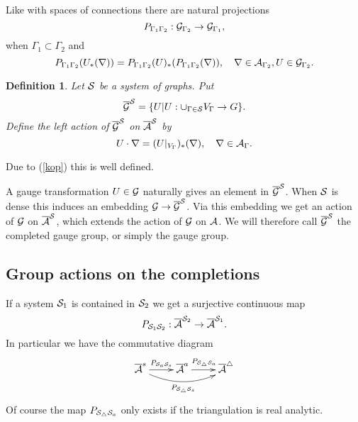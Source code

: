 \documentclass[12pt]{article}
\def\ca{{\cal A}}
\def\cg{{\cal G}}
\def\cs{{\cal S}}
\newtheorem{definition}[thm]{Definition}
\begin{document}
{Like with spaces of connections there are natural projections $$P_{\Gamma_1 \Gamma_2}:\cg_{\Gamma_2} \to \cg_{\Gamma_1},$$ 
when $\Gamma_1 \subset \Gamma_2$ and 
\begin{equation} \label{kop}
P_{\Gamma_1 \Gamma_2}(U_*(\nabla ))=P_{\Gamma_1 \Gamma_2}(U)_*(P_{\Gamma_1\Gamma_2}(\nabla)),\quad \nabla\in \ca_{\Gamma_2},U\in \cg_{\Gamma_2}.
 \end{equation}

\begin{definition}
Let $\cs$ be a system of graphs. Put 
$$\overline{\cg}^\cs=\{ U |U:\cup_{\Gamma \in \cs} V_\Gamma \to G\}.$$
Define the left action of $\overline{\cg}^\cs$ on $\overline{\ca}^\cs$ by
$$U \cdot \nabla= (U|_{V_\Gamma})_*(\nabla ),\quad \nabla\in \ca_\Gamma .$$  
\end{definition}

Due to (\ref{kop}) this is well defined.

A gauge transformation $U\in \cg$ naturally gives an element in $\overline{\cg}^\cs$. When $\cs$ is dense this induces an embedding $\cg \to \overline{\cg}^\cs$. Via this embedding we get an action of $\cg$ on $\overline{\ca}^\cs$, which extends the action of $\cg$ on $\ca$. We will therefore call $\overline{\cg}^\cs$ the completed gauge group, or simply the gauge group. 








\subsection{Group actions on the completions}
If a system $\cs_1$ is contained in $\cs_2$ we get a surjective continuous map 
$$P_{\cs_1 \cs_2}:\overline{\ca}^{\cs_2} \to \overline{\ca}^{\cs_1}.$$
In particular we have the commutative diagram
$$\hbox{\xymatrix{\overline{\ca}^s \ar@/_1pc/[rr]_{P_{\cs_\triangle \cs_s}}  \ar[r]^{P_{\cs_a \cs_s}} &\overline{\ca}^a  \ar[r]^{P_{\cs_\triangle \cs_a}} &\overline{\ca}^\triangle}}$$
Of course the map $P_{\cs_\triangle \cs_a}$ only exists if the triangulation is real analytic.

}
\end{document}
